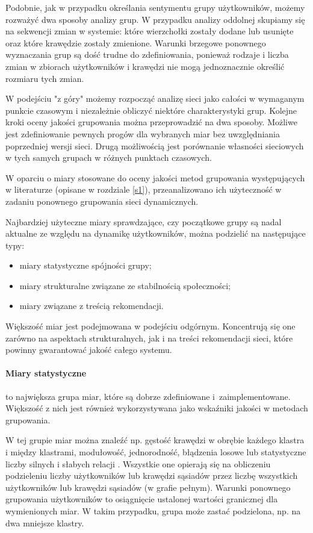 Podobnie, jak w przypadku określania sentymentu grupy użytkowników, możemy rozważyć dwa sposoby analizy grup. W przypadku analizy oddolnej skupiamy się na sekwencji zmian w systemie: które wierzchołki zostały dodane lub usunięte oraz które krawędzie zostały zmienione. Warunki brzegowe ponownego wyznaczania grup są dość trudne do zdefiniowania, ponieważ rodzaje i liczba zmian w zbiorach użytkowników i krawędzi nie mogą jednoznacznie określić rozmiaru tych zmian.

W podejściu "z góry" możemy rozpocząć analizę sieci jako całości w wymaganym punkcie czasowym i niezależnie obliczyć niektóre charakterystyki grup. Kolejne kroki oceny jakości grupowania można przeprowadzić na dwa sposoby. Możliwe jest zdefiniowanie pewnych progów dla wybranych miar bez uwzględniania poprzedniej wersji sieci. Drugą możliwością jest porównanie własności sieciowych w tych samych grupach w różnych punktach czasowych.

W oparciu o miary stosowane do oceny jakości metod grupowania występujących w literaturze (opisane w rozdziale \ref{s1}), przeanalizowano ich użyteczność w zadaniu ponownego grupowania sieci dynamicznych.

Najbardziej użyteczne miary sprawdzające, czy początkowe grupy są nadal aktualne ze względu na dynamikę użytkowników, można podzielić na następujące typy:
\begin{itemize}
\item miary statystyczne spójności grupy;
\item miary strukturalne związane ze stabilnością społeczności;
\item miary związane z treścią rekomendacji.
\end{itemize}

Większość miar jest podejmowana w podejściu odgórnym. Koncentrują się one zarówno na aspektach strukturalnych, jak i na treści rekomendacji sieci, które powinny gwarantować jakość całego systemu.

\paragraph{Miary statystyczne} to największa grupa miar, które są dobrze zdefiniowane i~zaimplementowane. Większość z nich jest również wykorzystywana jako wskaźniki jakości w metodach grupowania.

W tej grupie miar można znaleźć np. gęstość krawędzi w obrębie każdego klastra i między klastrami, modułowość, jednorodność, błądzenia losowe lub statystyczne liczby silnych i słabych relacji \cite{interian}. Wszystkie one opierają się na obliczeniu podzieleniu liczby użytkowników lub krawędzi sąsiadów przez liczbę wszystkich użytkowników lub krawędzi sąsiadów (w grafie pełnym). Warunki ponownego grupowania użytkowników to osiągnięcie ustalonej wartości granicznej dla wymienionych miar. W takim przypadku, grupa może zastać podzielona, np. na dwa mniejsze klastry.

